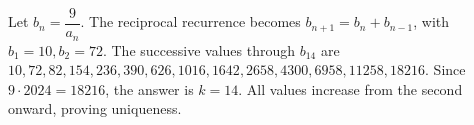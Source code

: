 Let $b_n=\dfrac{9}{a_n}$. The reciprocal recurrence becomes $b_{n+1}=b_n+b_{n-1}$, with $b_1=10,b_2=72$. The successive values through $b_{14}$ are $10,72,82,154,236,390,626,1016,1642,2658,4300,6958,11258,18216$. Since $9\cdot2024=18216$, the answer is $\boxed{k=14}$. All values increase from the second onward, proving uniqueness.
